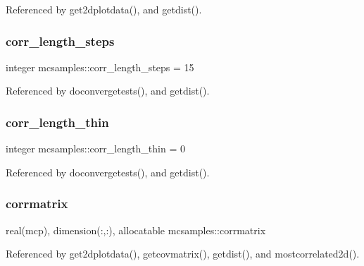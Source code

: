 Referenced by get2dplotdata(), and getdist().

\mbox{\label{namespacemcsamples_a7cabc6db7f9125c0af7b6de3032567f1}} 
\subsubsection{\texorpdfstring{corr\+\_\+length\+\_\+steps}{corr\_length\_steps}}
{\footnotesize\ttfamily integer mcsamples\+::corr\+\_\+length\+\_\+steps = 15}



Referenced by doconvergetests(), and getdist().

\mbox{\label{namespacemcsamples_af8a6d674d091942c7820c37ad6795f6b}} 
\subsubsection{\texorpdfstring{corr\+\_\+length\+\_\+thin}{corr\_length\_thin}}
{\footnotesize\ttfamily integer mcsamples\+::corr\+\_\+length\+\_\+thin = 0}



Referenced by doconvergetests(), and getdist().

\mbox{\label{namespacemcsamples_a6f7e8571ffd569f3c7538169829a9612}} 
\subsubsection{\texorpdfstring{corrmatrix}{corrmatrix}}
{\footnotesize\ttfamily real(mcp), dimension(\+:,\+:), allocatable mcsamples\+::corrmatrix}



Referenced by get2dplotdata(), getcovmatrix(), getdist(), and mostcorrelated2d().

\mbox{\label{namespacemcsamples_aee5291f542c82e3b053eea9aa4a22eef}} 
